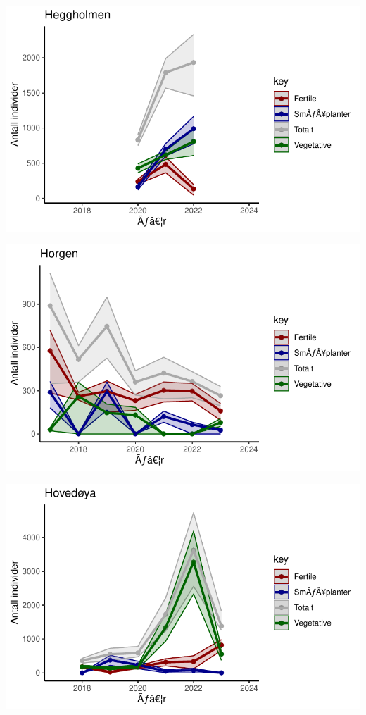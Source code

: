\documentclass[
  letterpaper,
  DIV=11,
  numbers=noendperiod]{scrreport}
\begin{document}
\includegraphics{localEst_files/figure-pdf/unnamed-chunk-4-2.pdf}

\includegraphics{localEst_files/figure-pdf/unnamed-chunk-4-3.pdf}

\includegraphics{localEst_files/figure-pdf/unnamed-chunk-4-4.pdf}
\end{document}
